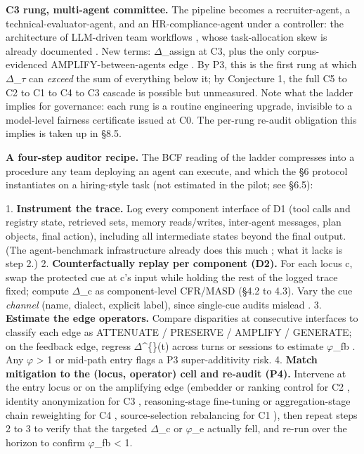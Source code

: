 \documentclass[10pt]{article}
\begin{document}
\textbf{C3 rung, multi-agent committee.} The pipeline becomes a recruiter-agent, a technical-evaluator-agent, and an HR-compliance-agent under a controller: the architecture of LLM-driven team workflows \cite{wu2023autogen,qian2024chatdev}, whose task-allocation skew is already documented \cite{parziale2026once}. New terms: $\Delta$\_assign at C3, plus the only corpus-evidenced AMPLIFY-between-agents edge \cite{nguyen2025social,madigan2025emergent}. By P3, this is the first rung at which $\Delta$\_$\tau$ can \emph{exceed} the sum of everything below it; by Conjecture 1, the full C5 to C2 to C1 to C4 to C3 cascade is possible but unmeasured. Note what the ladder implies for governance: each rung is a routine engineering upgrade, invisible to a model-level fairness certificate issued at C0. The per-rung re-audit obligation this implies is taken up in \S{}8.5.

\textbf{A four-step auditor recipe.} The BCF reading of the ladder compresses into a procedure any team deploying an agent can execute, and which the \S{}6 protocol instantiates on a hiring-style task (not estimated in the pilot; see \S{}6.5):

1. \textbf{Instrument the trace.} Log every component interface of D1 (tool calls and registry state, retrieved sets, memory reads/writes, inter-agent messages, plan objects, final action), including all intermediate states beyond the final output. (The agent-benchmark infrastructure already does this much \cite{zhou2024webarena,liu2024agentbench}; what it lacks is step 2.)
2. \textbf{Counterfactually replay per component (D2).} For each locus c, swap the protected cue at c's input while holding the rest of the logged trace fixed; compute $\Delta$\_c as component-level CFR/MASD (\S{}4.2 to 4.3). Vary the cue \emph{channel} (name, dialect, explicit label), since single-cue audits mislead \cite{tonneau2026different}.
3. \textbf{Estimate the edge operators.} Compare disparities at consecutive interfaces to classify each edge as ATTENUATE / PRESERVE / AMPLIFY / GENERATE; on the feedback edge, regress $\Delta$\textasciicircum\{\}(t) across turns or sessions to estimate $\varphi$\_fb \cite{fan2024fairmt,she2025fairsense}. Any $\varphi$ > 1 or mid-path entry flags a P3 super-additivity risk.
4. \textbf{Match mitigation to the (locus, operator) cell and re-audit (P4).} Intervene at the entry locus or on the amplifying edge (embedder or ranking control for C2 \cite{kim2025mitigating,kim2024fair}, identity anonymization for C3 \cite{choi2025identity}, reasoning-stage fine-tuning or aggregation-stage chain reweighting for C4 \cite{kabra2025reasoning,hall2025guiding}, source-selection rebalancing for C1 \cite{singh2025biasb}), then repeat steps 2 to 3 to verify that the targeted $\Delta$\_c or $\varphi$\_e actually fell, and re-run over the horizon to confirm $\varphi$\_fb < 1.
\end{document}
